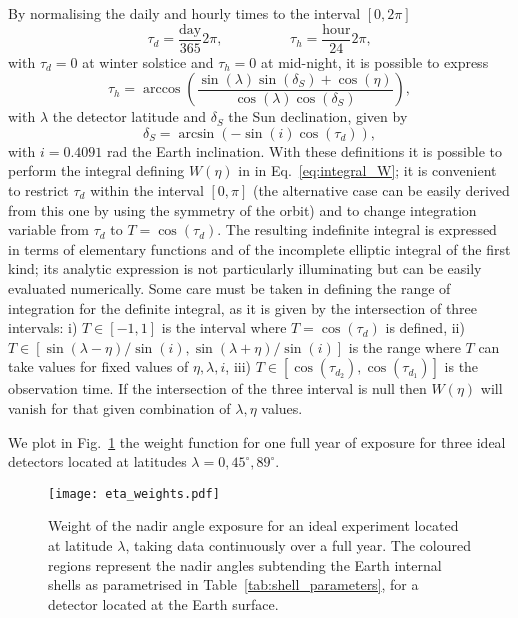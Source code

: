 \documentclass[11pt,a4paper]{article}
\begin{document}
By normalising the daily and hourly times to the interval $[0, 2 \pi]$
\begin{equation}
	\tau_d = \frac{\text{day}}{365} 2\pi, \hspace{2cm} \tau_h = \frac{\text{hour}}{24} 2\pi,
\end{equation}
with $\tau_d=0$ at winter solstice and $\tau_h=0$ at mid-night, it is possible to express
\begin{equation}
	\tau_h = \arccos\left(\frac{\sin(\lambda) \sin(\delta_S) + \cos(\eta)}{\cos(\lambda) \cos(\delta_S)} \right),
\end{equation}
with $\lambda$ the detector latitude and $\delta_S$ the Sun declination, given by
\begin{equation}
	\delta_S = \arcsin\left(-\sin(i) \cos(\tau_d)\right),
\end{equation}
with $i=0.4091$ rad the Earth inclination. With these definitions it is possible to perform the integral defining $W(\eta)$ in in Eq.~\ref{eq:integral_W}; it is convenient to restrict $\tau_d$ within the interval $[0, \pi]$ (the alternative case can be easily derived from this one by using the symmetry of the orbit) and to change integration variable from $\tau_d$ to $T = \cos(\tau_d)$. 
The resulting indefinite integral is expressed in terms of elementary functions and of the incomplete elliptic integral of the first kind; its analytic expression is not particularly illuminating but can be easily evaluated numerically.
Some care must be taken in defining the range of integration for the definite integral, as it is given by the intersection of three intervals: i) $T \in [-1, 1]$ is the interval where $T=\cos(\tau_d)$ is defined, ii) $T \in [\sin(\lambda - \eta)/\sin(i), \sin(\lambda + \eta)/\sin(i)]$ is the range where $T$ can take values for fixed values of $\eta, \lambda, i$, iii) $T \in [\cos(\tau_{d_2}), \cos(\tau_{d_1})]$ is the observation time. If the intersection of the three interval is null then $W(\eta)$ will vanish for that given combination of $\lambda, \eta$ values.

We plot in Fig.~\ref{fig:eta_weights} the weight function for one full year of exposure for three ideal detectors located at latitudes $\lambda = 0, 45^\circ, 89^\circ$.
\begin{figure}[ht]
	\texttt{[image: eta\_weights.pdf]}	
	\caption{Weight of the nadir angle exposure for an ideal experiment located at latitude $\lambda$, taking data continuously over a full year. The coloured regions represent the nadir angles subtending the Earth internal shells as parametrised in Table~\ref{tab:shell_parameters}, for a detector located at the Earth surface.}
	\label{fig:eta_weights}
\end{figure}



\end{document}
